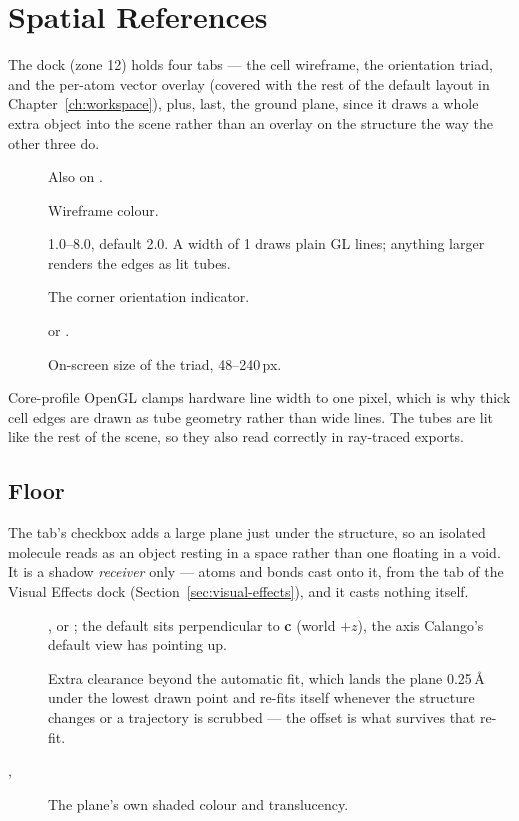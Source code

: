 \section{Spatial References}
\label{sec:spatial-references}

The  dock (zone 12) holds four tabs --- the cell
wireframe, the orientation triad, and the per-atom vector overlay (covered
with the rest of the default layout in Chapter~\ref{ch:workspace}), plus,
last, the ground plane, since it draws a whole extra object into the scene
rather than an overlay on the structure the way the other three do.

\begin{description}
  \item[] Also on \menusep{}.
  \item[] Wireframe colour.
  \item[] 1.0--8.0, default 2.0. A width of 1 draws
    plain GL lines; anything larger renders the edges as lit tubes.
  \item[] The corner orientation indicator.
  \item[]  or
    .
  \item[] On-screen size of the triad, 48--240\,px.
\end{description}

\begin{calnote}
Core-profile OpenGL clamps hardware line width to one pixel, which is why
thick cell edges are drawn as tube geometry rather than wide lines. The
tubes are lit like the rest of the scene, so they also read correctly in
ray-traced exports.
\end{calnote}

\subsection{Floor}

The  tab's  checkbox adds a large plane
just under the structure, so an isolated molecule reads as an object
resting in a space rather than one floating in a void. It is a shadow
\emph{receiver} only --- atoms and bonds cast onto it, from the
 tab of the Visual Effects dock (Section~\ref{sec:visual-effects}),
and it casts nothing itself.

\begin{description}
  \item[] ,  or ; the default  sits
    perpendicular to \textbf{c} (world $+z$), the axis Calango's default
    view has pointing up.
  \item[] Extra clearance beyond the automatic fit, which lands
    the plane 0.25\,\AA{} under the lowest drawn point and re-fits itself
    whenever the structure changes or a trajectory is scrubbed --- the
    offset is what survives that re-fit.
  \item[, ] The plane's own shaded colour and
    translucency.
\end{description}

